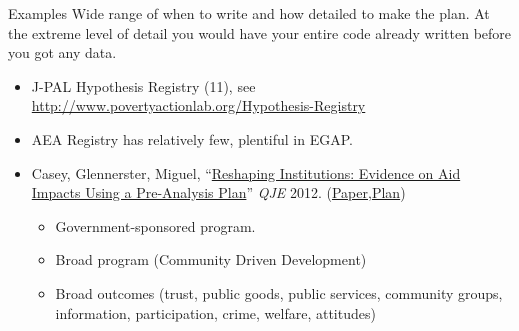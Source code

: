 \documentclass{beamer}
\begin{document}
\begin{frame}{Examples}
Wide range of when to write and how detailed to make the plan. At the extreme level of detail you would have your entire code already written before you got any data.
\begin{itemize}
\item
J-PAL Hypothesis Registry (11), see \url{http://www.povertyactionlab.org/Hypothesis-Registry}
\item
AEA Registry has relatively few, plentiful in EGAP.
\item
Casey, Glennerster, Miguel, ``\href{http://www.nber.org/data-appendix/w17012/GBF_Supplementary_Appendix_2011-10-07.pdf}{Reshaping Institutions: Evidence on Aid Impacts Using a Pre-Analysis Plan}'' \textit{QJE} 2012. (\href{http://http://eml.berkeley.edu/~emiguel/pdfs/miguel_gbf.pdf}{Paper},\href{http://www.nber.org/data-appendix/w17012/GBF_Supplementary_Appendix_2011-10-07.pdf}{Plan})
\begin{itemize}
 \item Government-sponsored program.
 \item Broad program (Community Driven Development)
 \item Broad outcomes (trust, public goods, public services, community groups, information, participation, crime, welfare, attitudes)
 \end{itemize} 
\end{itemize} 
\end{frame}
\end{document}

